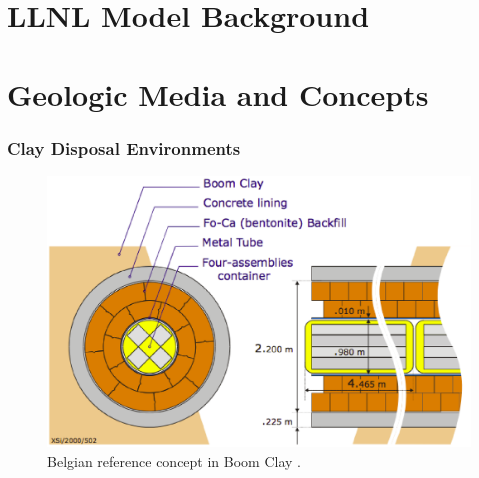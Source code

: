 \appendix
{}
\setcounter{finalframe}{\value{framenumber}}
\section{LLNL Model Background}

\section{Geologic Media and Concepts}
\begin{frame}[ctb!]
  \frametitle{Clay Disposal Environments}
  \footnotesize{

  \begin{figure}[h!]
    \begin{center}
      \includegraphics[height=.7\textheight]{./images/belgianClayRedImp.eps}
    \end{center}
    \caption{Belgian reference concept in Boom Clay 
    \cite{von_lensa_red-impact_2008}.}
    \label{fig:belgianClayRedImp}
  \end{figure}

}
\end{frame}

